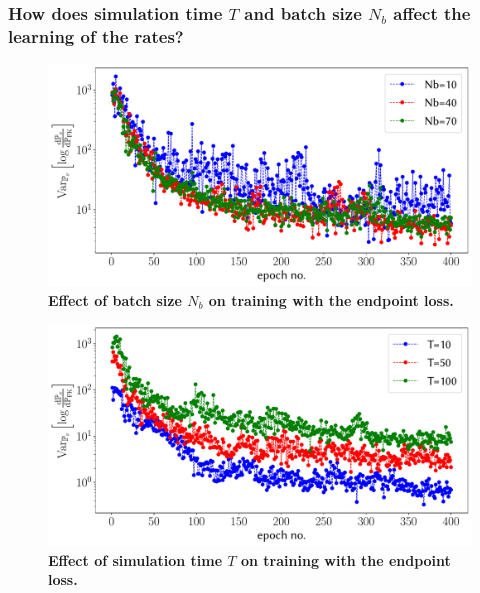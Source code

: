 \subsubsection{How does simulation time $T$ and batch size $N_b$ affect the learning of the rates?}
\begin{figure}[H]
	\centering
	\includegraphics[width=\linewidth]{Chapter6/Figs/Vector/bvl_single}
	\caption[Effect of batch size $N_b$ on training with the endpoint loss.]{\textbf{Effect of batch size $N_b$ on training with the endpoint loss.}}
	\label{fig:bvlsingle}
\end{figure}
\begin{figure}[H]
	\centering
	\includegraphics[width=\linewidth]{Chapter6/Figs/Vector/tvl_single}
	\caption[Effect of simulation time $T$ on training with the endpoint loss.]{\textbf{Effect of simulation time $T$ on training with the endpoint loss.}}
	\label{fig:tvlsingle}
\end{figure}

